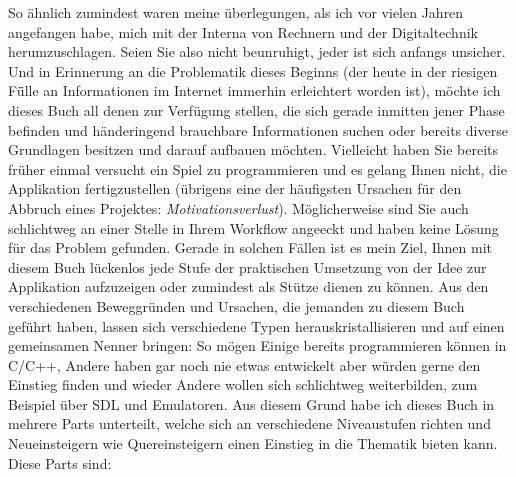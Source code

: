 \documentclass[a4paper,10pt,dvips,fleqn,titlepage,twoside]{book}
\begin{document}
So ähnlich zumindest waren meine \"{u}berlegungen, als ich vor vielen Jahren angefangen habe, mich mit der Interna von Rechnern und der Digitaltechnik herumzuschlagen. Seien Sie also nicht beunruhigt, jeder ist sich anfangs unsicher. Und in Erinnerung an die Problematik dieses Beginns (der heute in der riesigen F\"{ü}lle an Informationen im Internet immerhin erleichtert worden ist), m\"{o}chte ich dieses Buch all denen zur Verf\"{u}gung stellen, die sich gerade inmitten jener Phase befinden und händeringend brauchbare Informationen suchen oder bereits diverse Grundlagen besitzen und darauf aufbauen m\"{o}chten.\newline
Vielleicht haben Sie bereits früher einmal versucht ein Spiel zu programmieren und es gelang Ihnen nicht, die Applikation fertigzustellen (übrigens eine der häufigsten Ursachen für den Abbruch eines Projektes: \textit{Motivationsverlust}). Möglicherweise sind Sie auch schlichtweg an einer Stelle in Ihrem Workflow angeeckt und haben keine Lösung für das Problem gefunden.
Gerade in solchen Fällen ist es mein Ziel, Ihnen mit diesem Buch lückenlos jede Stufe der praktischen Umsetzung von der Idee zur Applikation aufzuzeigen oder zumindest als Stütze dienen zu können.
Aus den verschiedenen Beweggründen und Ursachen, die jemanden zu diesem Buch geführt haben, lassen sich verschiedene Typen herauskristallisieren und auf einen gemeinsamen Nenner bringen: So mögen Einige bereits programmieren können in C/C++, Andere haben gar noch nie etwas entwickelt aber würden gerne den Einstieg finden und wieder Andere wollen sich schlichtweg weiterbilden, zum Beispiel über SDL und Emulatoren. Aus diesem Grund habe ich dieses Buch in mehrere Parts unterteilt, welche sich an verschiedene Niveaustufen richten und Neueinsteigern wie Quereinsteigern einen Einstieg in die Thematik bieten kann. Diese Parts sind:
\newline
\end{document}
